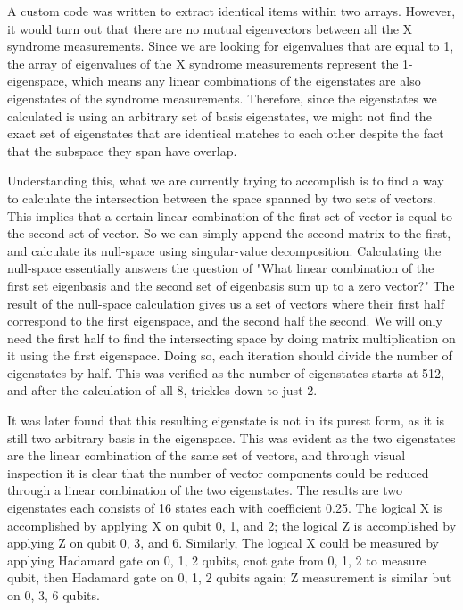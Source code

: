 \documentclass{article}
\begin{document}
A custom code was written to extract identical items within two arrays. However, it would turn out that there are no mutual eigenvectors between all the X syndrome measurements. Since we are looking for eigenvalues that are equal to 1, the array of eigenvalues of the X syndrome measurements represent the 1-eigenspace, which means any linear combinations of the eigenstates are also eigenstates of the syndrome measurements. Therefore, since the eigenstates we calculated is using an arbitrary set of basis eigenstates, we might not find the exact set of eigenstates that are identical matches to each other despite the fact that the subspace they span have overlap.

Understanding this, what we are currently trying to accomplish is to find a way to calculate the intersection between the space spanned by two sets of vectors. This implies that a certain linear combination of the first set of vector is equal to the second set of vector. So we can simply append the second matrix to the first, and calculate its null-space using singular-value decomposition. Calculating the null-space essentially answers the question of "What linear combination of the first set eigenbasis and the second set of eigenbasis sum up to a zero vector?" The result of the null-space calculation gives us a set of vectors where their first half correspond to the first eigenspace, and the second half the second. We will only need the first half to find the intersecting space by doing matrix multiplication on it using the first eigenspace. Doing so, each iteration should divide the number of eigenstates by half. This was verified as the number of eigenstates starts at 512, and after the calculation of all 8, trickles down to just 2.

It was later found that this resulting eigenstate is not in its purest form, as it is still two arbitrary basis in the eigenspace. This was evident as the two eigenstates are the linear combination of the same set of vectors, and through visual inspection it is clear that the number of vector components could be reduced through a linear combination of the two eigenstates. The results are two eigenstates each consists of 16 states each with coefficient 0.25. The logical X is accomplished by applying X on qubit 0, 1, and 2; the logical Z is accomplished by applying Z on qubit 0, 3, and 6. Similarly, The logical X could be measured by applying Hadamard gate on 0, 1, 2 qubits, cnot gate from 0, 1, 2 to measure qubit, then Hadamard gate on 0, 1, 2 qubits again; Z measurement is similar but on 0, 3, 6 qubits.
\end{document}
